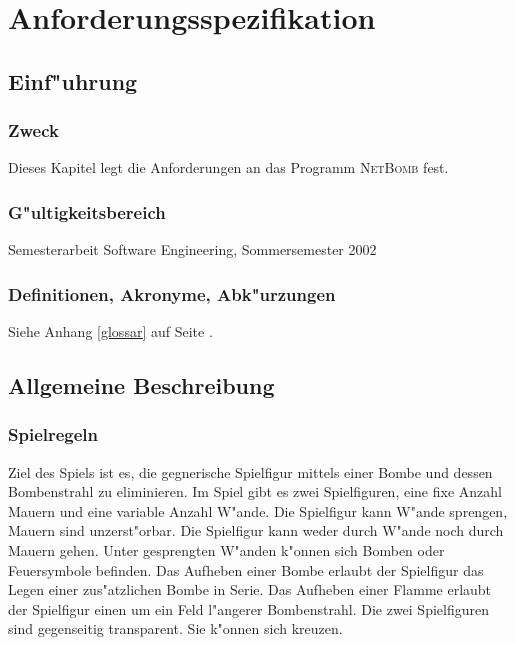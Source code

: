 \chapter{Anforderungsspezifikation}

\section{Einf"uhrung}

\subsection{Zweck}
Dieses Kapitel legt die Anforderungen an das Programm \textsc{NetBomb} fest.

\subsection{G"ultigkeitsbereich}
Semesterarbeit Software Engineering, Sommersemester 2002

\subsection{Definitionen, Akronyme, Abk"urzungen}
Siehe Anhang \ref{glossar} auf Seite \pageref{glossar}.

\section{Allgemeine Beschreibung}
\subsection{Spielregeln}

Ziel des Spiels ist es, die gegnerische Spielfigur mittels einer Bombe und dessen Bombenstrahl zu eliminieren.
Im Spiel gibt es zwei Spielfiguren, eine fixe Anzahl Mauern und eine variable Anzahl W"ande.
Die Spielfigur kann W"ande sprengen, Mauern sind unzerst"orbar.
Die Spielfigur kann weder durch W"ande noch durch Mauern gehen.
Unter gesprengten W"anden k"onnen sich Bomben oder Feuersymbole befinden. Das Aufheben einer Bombe erlaubt der Spielfigur
das Legen einer zus"atzlichen Bombe in Serie. Das Aufheben einer Flamme erlaubt der Spielfigur einen um ein Feld
l"angerer Bombenstrahl.
Die zwei Spielfiguren sind gegenseitig transparent. Sie k"onnen sich kreuzen.


